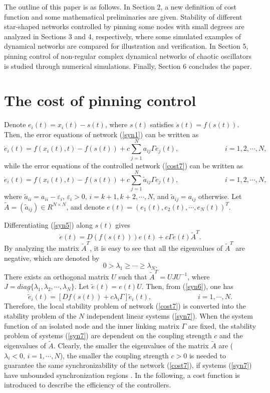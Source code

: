 \documentclass[11pt]{article}
\def\dref#1{(\ref{#1})}
\begin{document}
The outline of this paper is as follows. In Section 2, a new
definition of cost function and some mathematical preliminaries are
given. Stability of different star-shaped networks controlled by
pinning some nodes with small degrees are analyzed in Sections 3 and
4, respectively, where some simulated examples of dynamical networks
are compared for illustration and verification. In Section 5,
pinning control of non-regular complex dynamical networks of chaotic
oscillators is studied through numerical simulations. Finally,
Section 6 concludes the paper.

\section{The cost of pinning control}

\quad Denote $e_i(t)=x_i(t)-s(t)$, where $s(t)$ satisfies $\dot
s(t)=f(s(t))$. Then, the error equations of network \dref{syn1} can
be written as
$$
\dot e_i(t)=f(x_i(t),t)-f(s(t))+c\sum ^{N}_{j=1}a_{ij}\Gamma
 e_j(t),\qquad\qquad\qquad\;\;
i=1,2,\cdots,N,
$$
while the error equations of the controlled network \dref{cost7} can
be written as
\begin{equation}\label{syn5}
\dot e_i(t)=f(x_i(t),t)-f(s(t))+c\sum ^{N}_{j=1}\tilde{a}_{ij}\Gamma
 e_j(t),\qquad\qquad\qquad\;\;
i=1,2,\cdots,N,
\end{equation}
where
$\tilde{a}_{ii}=a_{ii}-\varepsilon_i,\,\varepsilon_i>0,\,i=k+1,k+2,\cdots,N$,
and $\tilde{a}_{ij}=a_{ij}$ otherwise. Let
$\tilde{A}=(\tilde{a}_{ij})\in R^{N\times N}$, and denote
$e(t)=(e_1(t),e_2(t),\cdots,e_N(t))^T$.

Differentiating \dref{syn5} along $s(t)$ gives
\begin{equation}\label{syn6}
\dot e(t)=D(f(s(t)))e(t)+c\Gamma e(t)\tilde{A}^T.
\end{equation}
By analyzing the matrix $\tilde{A}^T$, it is easy to see that all
the eigenvalues of $\tilde{A}^T$ are negative, which are denoted by
$$
0>\lambda_1\geq\cdots\geq\lambda_N.
$$
There exists an orthogonal matrix $U$ such that
$\tilde{A}^T=UJU^{-1}$, where
$J=diag\{\lambda_1,\lambda_2,\cdots,\lambda_N\}$. Let
$\tilde{e}(t)=e(t)U$. Then, from \dref{syn6}, one has
\begin{equation}\label{syn7}
\dot
{\tilde{e}}_i(t)=[Df(s(t))+c\lambda_i\Gamma]\tilde{e}_i(t),\qquad\qquad\qquad\;\;
i=1,\cdots,N.
\end{equation}
Therefore, the local stability problem of network \dref{cost7} is
converted into the stability problem of the $N$ independent linear
systems \dref{syn7}. When the system function of an isolated node
and the inner linking matrix $\Gamma$ are fixed, the stability
problem of systems \dref{syn7} are dependent on the coupling
strength $c$ and the eigenvalues of $\tilde{A}$. Clearly, the
smaller the eigenvalues of the matrix $\tilde{A}$ are
($\lambda_i<0,\,i=1,\cdots,N$), the smaller the coupling strength
$c>0$ is needed to guarantee the same synchronizability of the
network \dref{cost7}, if systems \dref{syn7} have unbounded
synchronization regions \cite{jia52}. In the following, a cost
function is introduced to describe the efficiency of the
controllers.
\end{document}
